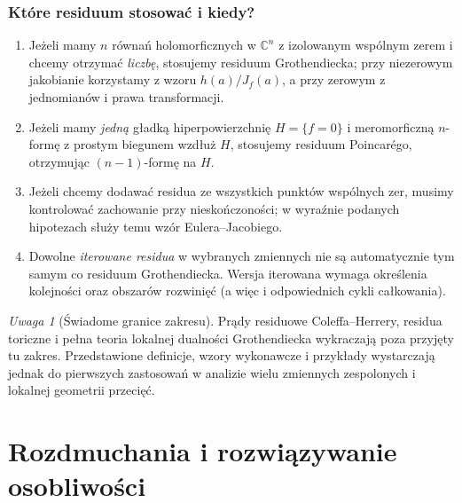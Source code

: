 \documentclass[11pt,a4paper,openany]{report}
\numberwithin{equation}{section}
\theoremstyle{plain}
\theoremstyle{definition}
\theoremstyle{remark}
\newtheorem{uwaga}[twierdzenie]{Uwaga}
\newcommand{\C}{\mathbb C}
\begin{document}
\subsection{Które residuum stosować i kiedy?}
\begin{enumerate}[label=\arabic*)]
\item Jeżeli mamy $n$ równań holomorficznych w $\C^n$ z izolowanym
wspólnym zerem i chcemy otrzymać \emph{liczbę}, stosujemy residuum
Grothendiecka; przy niezerowym jakobianie korzystamy z wzoru
$h(a)/J_f(a)$, a przy zerowym z jednomianów i prawa transformacji.
\item Jeżeli mamy \emph{jedną} gładką hiperpowierzchnię $H=\{f=0\}$
i meromorficzną $n$-formę z prostym biegunem wzdłuż $H$,
stosujemy residuum Poincarégo, otrzymując $(n-1)$-formę na $H$.
\item Jeżeli chcemy dodawać residua ze wszystkich punktów wspólnych
zer, musimy kontrolować zachowanie przy nieskończoności;
w wyraźnie podanych hipotezach służy temu wzór Eulera--Jacobiego.
\item Dowolne \emph{iterowane residua} w wybranych zmiennych nie są
automatycznie tym samym co residuum Grothendiecka.
Wersja iterowana wymaga określenia kolejności oraz
obszarów rozwinięć (a więc i odpowiednich cykli całkowania).
\end{enumerate}

\begin{uwaga}[Świadome granice zakresu]
Prądy residuowe Coleffa--Herrery, residua toriczne i
pełna teoria lokalnej dualności Grothendiecka wykraczają
poza przyjęty tu zakres. Przedstawione definicje, wzory
wykonawcze i przykłady wystarczają jednak do pierwszych
zastosowań w analizie wielu zmiennych zespolonych
i lokalnej geometrii przecięć.
\end{uwaga}



\chapter{Rozdmuchania i rozwiązywanie osobliwości}
\label{ch:ga5-rozdmuchania}
\end{document}
